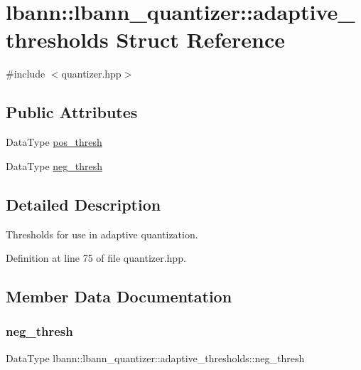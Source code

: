 \hypertarget{structlbann_1_1lbann__quantizer_1_1adaptive__thresholds}{}\section{lbann\+:\+:lbann\+\_\+quantizer\+:\+:adaptive\+\_\+thresholds Struct Reference}
\label{structlbann_1_1lbann__quantizer_1_1adaptive__thresholds}


{\ttfamily \#include $<$quantizer.\+hpp$>$}

\subsection*{Public Attributes}
\begin{DoxyCompactItemize}
\item 
Data\+Type \hyperlink{structlbann_1_1lbann__quantizer_1_1adaptive__thresholds_a6f6aee51ed629c2ab68666d577189bb9}{pos\+\_\+thresh}
\item 
Data\+Type \hyperlink{structlbann_1_1lbann__quantizer_1_1adaptive__thresholds_a4626553695545cf0783c3f7302f92fbf}{neg\+\_\+thresh}
\end{DoxyCompactItemize}


\subsection{Detailed Description}
Thresholds for use in adaptive quantization. 

Definition at line 75 of file quantizer.\+hpp.



\subsection{Member Data Documentation}
\mbox{\label{structlbann_1_1lbann__quantizer_1_1adaptive__thresholds_a4626553695545cf0783c3f7302f92fbf}} 
\subsubsection{\texorpdfstring{neg\+\_\+thresh}{neg\_thresh}}
{\footnotesize\ttfamily Data\+Type lbann\+::lbann\+\_\+quantizer\+::adaptive\+\_\+thresholds\+::neg\+\_\+thresh}

